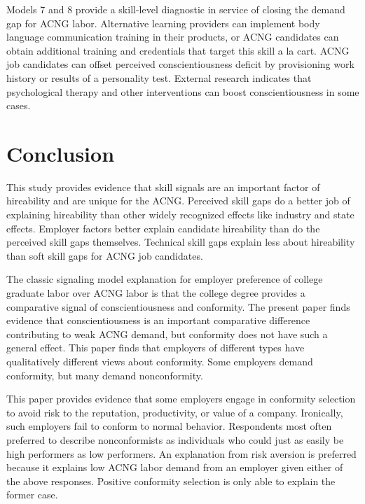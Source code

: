\documentclass[review]{elsarticle}
\begin{document}
Models 7 and 8 provide a skill-level diagnostic in service of closing the demand gap for ACNG labor.
Alternative learning providers can implement body language communication training in their products,
or ACNG candidates can obtain additional training and credentials that target this skill a la cart.
ACNG job candidates can offset perceived conscientiousness deficit by provisioning work history or results of a personality test.
External research indicates that psychological therapy and other interventions can boost conscientiousness in some cases\cite{kilduff_tasselli_landis_2018}.

\section{Conclusion}

This study provides evidence that skill signals are an important factor of hireability and are unique for the ACNG.
Perceived skill gaps do a better job of explaining hireability than other widely recognized effects like industry and state effects.
Employer factors better explain candidate hireability than do the perceived skill gaps themselves.
Technical skill gaps explain less about hireability than soft skill gaps for ACNG job candidates.

The classic signaling model explanation for employer preference of college graduate labor over ACNG labor is that
the college degree provides a comparative signal of conscientiousness and conformity.
The present paper finds evidence that conscientiousness is an important comparative difference contributing to weak ACNG demand,
but conformity does not have such a general effect.
This paper finds that employers of different types have qualitatively different views about conformity.
Some employers demand conformity, but many demand nonconformity.

This paper provides evidence that some employers engage in conformity selection to avoid risk to the reputation, productivity, or value of a company.
Ironically, such employers fail to conform to normal behavior.
Respondents most often preferred to describe nonconformists as individuals who could just as easily be high performers as low performers.
An explanation from risk aversion is preferred because it explains low ACNG labor demand from an employer given either of the above responses.
Positive conformity selection is only able to explain the former case.
\end{document}
